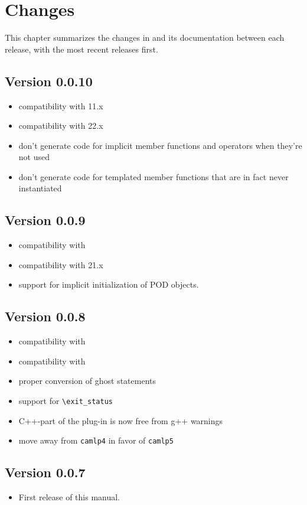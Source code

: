 \chapter{Changes}\label{chap:changes}

This chapter summarizes the changes in \fclang and its documentation
between each release, with the most recent releases first.

\section*{Version 0.0.10}
\begin{itemize}
\item compatibility with \clang 11.x
\item compatibility with \framac 22.x
\item don't generate code for implicit member functions and operators when
 they're not used
\item don't generate code for templated member functions that are in fact never
  instantiated
\end{itemize}

\section*{Version 0.0.9}
\begin{itemize}
\item compatibility with 
\item compatibility with \framac 21.x
\item support for implicit initialization of POD objects.
\end{itemize}

\section*{Version 0.0.8}
\begin{itemize}
\item compatibility with 
\item compatibility with 
\item proper conversion of ghost statements
\item support for \acslpp \lstinline|\exit_status|
\item C++-part of the plug-in is now free from g++ warnings
\item move away from \lstinline|camlp4| in favor of \lstinline|camlp5|
\end{itemize}

\section*{Version 0.0.7}
\begin{itemize}
\item First release of this manual.
\end{itemize}
